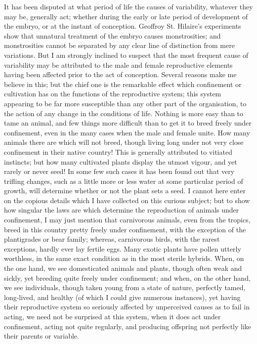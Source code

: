 \documentclass{book}
\begin{document}
It has been disputed at what period of life the causes of variability, whatever
they may be, generally act; whether during the early or late period of
development of the embryo, or at the instant of conception. Geoffroy St.
Hilaire's experiments show that unnatural treatment of the embryo causes
monstrosities; and monstrosities cannot be separated by any clear line of
distinction from mere variations. But I am strongly inclined to suspect that
the most frequent cause of variability may be attributed to the male and female
reproductive elements having been affected prior to the act of conception.
Several reasons make me believe in this; but the chief one is the remarkable
effect which confinement or cultivation has on the functions of the
reproductive system; this system appearing to be far more susceptible than any
other part of the organisation, to the action of any change in the conditions
of life. Nothing is more easy than to tame an animal, and few things more
difficult than to get it to breed freely under confinement, even in the many
cases when the male and female unite. How many animals there are which will not
breed, though living long under not very close confinement in their native
country! This is generally attributed to vitiated instincts; but how many
cultivated plants display the utmost vigour, and yet rarely or never seed! In
some few such cases it has been found out that very trifling changes, such as a
little more or less water at some particular period of growth, will determine
whether or not the plant sets a seed. I cannot here enter on the copious
details which I have collected on
this curious subject; but to show how singular the laws are which determine the
reproduction of animals under confinement, I may just mention that carnivorous
animals, even from the tropics, breed in this country pretty freely under
confinement, with the exception of the plantigrades or bear family; whereas,
carnivorous birds, with the rarest exceptions, hardly ever lay fertile eggs.
Many exotic plants have pollen utterly worthless, in the same exact condition
as in the most sterile hybrids. When, on the one hand, we see domesticated
animals and plants, though often weak and sickly, yet breeding quite freely
under confinement; and when, on the other hand, we see individuals, though
taken young from a state of nature, perfectly tamed, long-lived, and healthy
(of which I could give numerous instances), yet having their reproductive
system so seriously affected by unperceived causes as to fail in acting, we
need not be surprised at this system, when it does act under confinement,
acting not quite regularly, and producing offspring not perfectly like their
parents or variable.
\end{document}
